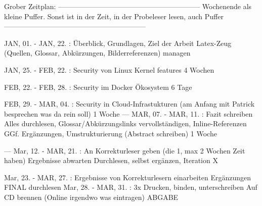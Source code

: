 Grober Zeitplan:
------------------------------------------------------------
Wochenende als kleine Puffer.
Sonst ist in der Zeit, in der Probeleser lesen, auch Puffer
------------------------------------------------------------

JAN, 01. - JAN, 22. : Überblick, Grundlagen, Ziel der Arbeit
                      Latex-Zeug (Quellen, Glossar, Abkürzungen, Bilderreferenzen) managen

JAN, 25. - FEB, 22. : Security von Linux Kernel features
                      4 Wochen

FEB, 22. - FEB, 28. : Security im Docker Ökosystem
                      6 Tage

FEB, 29. - MAR, 04. : Security in Cloud-Infrastukturen (am Anfang mit Patrick besprechen was da rein soll)
                      1 Woche
---
MAR, 07. - MAR, 11. : Fazit schreiben
                      Alles durchlesen, Glossar/Abkürzungslinks vervollständigen, Inline-Referenzen
                      GGf. Ergänzungen, Umstrukturierung
                      (Abstract schreiben)
                      1 Woche

---
Mar, 12. - MAR, 21. : An Korrekturleser geben (die 1, max 2 Wochen Zeit haben)
                      Ergebnisse abwarten
                      Durchlesen, selbst ergänzen, Iteration X

Mar, 23. - MAR, 27. : Ergebnisse von Korrekturlesern einarbeiten
                      Ergänzungen
                      FINAL durchlesen
Mar, 28. - MAR, 31. : 3x Drucken, binden, unterschreiben
                      Auf CD brennen
                      (Online irgendwo was eintragen)
                      ABGABE
